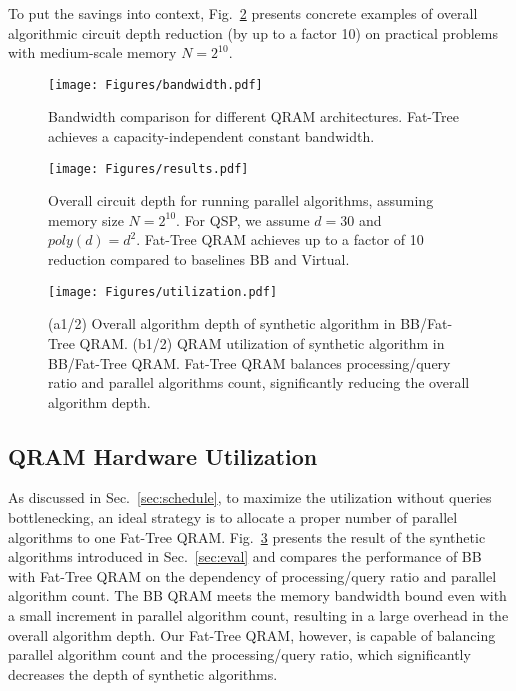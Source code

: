 To put the savings into context, Fig.~\ref{fig:parallelalg} presents concrete examples of overall algorithmic circuit depth reduction (by up to a factor 10) on practical problems with medium-scale memory $N=2^{10}$.

\begin{figure}[t]
         \centering
         \texttt{[image: Figures/bandwidth.pdf]}
         \caption{Bandwidth comparison for different QRAM architectures. Fat-Tree achieves a capacity-independent constant bandwidth.}
         \label{fig:bandwidth}
\end{figure}



\begin{figure}[t]
         \centering
         \texttt{[image: Figures/results.pdf]}
         \caption{Overall circuit depth for running parallel algorithms, assuming memory size $N=2^{10}$. For QSP, we assume $d=30$ and $poly(d)=d^2$. Fat-Tree QRAM achieves up to a factor of 10 reduction compared to baselines BB and Virtual.}
         \label{fig:parallelalg}
\end{figure}


\begin{figure}[t]
         \centering
         \texttt{[image: Figures/utilization.pdf]}
         \caption{(a1/2) Overall algorithm depth of synthetic algorithm in BB/Fat-Tree QRAM. (b1/2) QRAM utilization of synthetic algorithm in BB/Fat-Tree QRAM. Fat-Tree QRAM balances processing/query ratio and parallel algorithms count, significantly reducing the overall algorithm depth.}
         \label{fig:utilization}
\end{figure}

\subsection{QRAM Hardware Utilization}
\label{sec:utibench}
As discussed in Sec.~\ref{sec:schedule}, to maximize the utilization without queries bottlenecking, an ideal strategy is to allocate a proper number of parallel algorithms to one Fat-Tree QRAM. Fig.~\ref{fig:utilization} presents the result of the synthetic algorithms introduced in Sec.~\ref{sec:eval} and compares the performance of BB with Fat-Tree QRAM on the dependency of processing/query ratio and parallel algorithm count. 
The BB QRAM meets the memory bandwidth bound even with a small increment in parallel algorithm count, resulting in a large overhead in the overall algorithm depth. Our Fat-Tree QRAM, however, is capable of balancing parallel algorithm count and the processing/query ratio, which significantly decreases the depth of synthetic algorithms.

